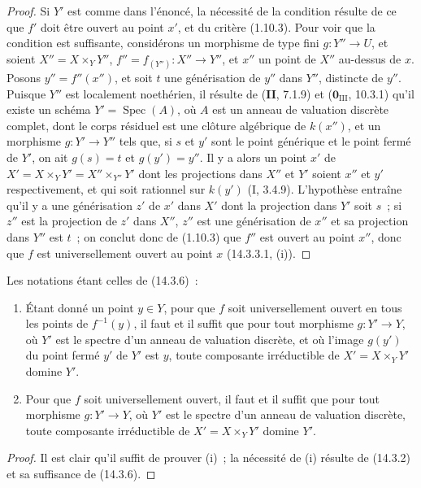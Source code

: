 \begin{proof}
Si $Y'$ est comme dans l'énoncé, la nécessité de la condition résulte de ce que
$f'$ doit être ouvert au point $x'$, et du critère (1.10.3). Pour voir que la
condition est suffisante, considérons un morphisme de type fini $g:Y''\to U$, et
soient $X''=X\times_Y Y''$, $f''=f_{(Y'')}:X''\to Y''$, et $x''$ un point de $X''$
au-dessus de $x$. Posons $y''=f''(x'')$, et soit $t$ une générisation de $y''$
dans $Y''$, distincte de $y''$. Puisque $Y''$ est localement noethérien, il
résulte de (\textbf{II}, 7.1.9) et ($\mathbf{0}_{\mathrm{III}}$, 10.3.1) qu'il
existe un schéma $Y'=\operatorname{Spec}(A)$, où $A$ est un anneau de valuation
discrète complet, dont le corps résiduel est une clôture algébrique de $k(x'')$,
et un morphisme $g:Y'\to Y''$ tels que, si $s$ et $y'$ sont le point générique et
le point fermé de $Y'$, on ait $g(s)=t$ et $g(y')=y''$. Il y a alors un point $x'$
de $X'=X\times_Y Y'=X''\times_{Y''}Y'$ dont les projections dans $X''$ et $Y'$
soient $x''$ et $y'$ respectivement, et qui soit rationnel sur $k(y')$ (I, 3.4.9).
L'hypothèse entraîne qu'il y a une générisation $z'$ de $x'$ dans $X'$ dont la
projection dans $Y'$ soit $s$~; si $z''$ est la projection de $z'$ dans $X''$,
$z''$ est une générisation de $x''$ et sa projection dans $Y''$ est $t$~; on
conclut donc de (1.10.3) que $f''$ est ouvert au point $x''$, donc que $f$ est
universellement ouvert au point $x$ (14.3.3.1, (i)).
\end{proof}

\begin{corollary}[14.3.7]
\label{IV.14.3.7-fr}
Les notations étant celles de (14.3.6)~:
\begin{enumerate}[label=(\roman*)]
  \item Étant donné un point $y\in Y$, pour que $f$ soit universellement ouvert en
  tous les points de $f^{-1}(y)$, il faut et il suffit que pour tout morphisme
  $g:Y'\to Y$, où $Y'$ est le spectre d'un anneau de valuation discrète, et où
  l'image $g(y')$ du point fermé $y'$ de $Y'$ est $y$, toute composante
  irréductible de $X'=X\times_Y Y'$ domine $Y'$.
  \item Pour que $f$ soit universellement ouvert, il faut et il suffit que pour
  tout morphisme $g:Y'\to Y$, où $Y'$ est le spectre d'un anneau de valuation
  discrète, toute composante irréductible de $X'=X\times_Y Y'$ domine $Y'$.
\end{enumerate}
\end{corollary}

\begin{proof}
Il est clair qu'il suffit de prouver (i)~; la nécessité de (i) résulte de (14.3.2)
et sa suffisance de (14.3.6).
\end{proof}

